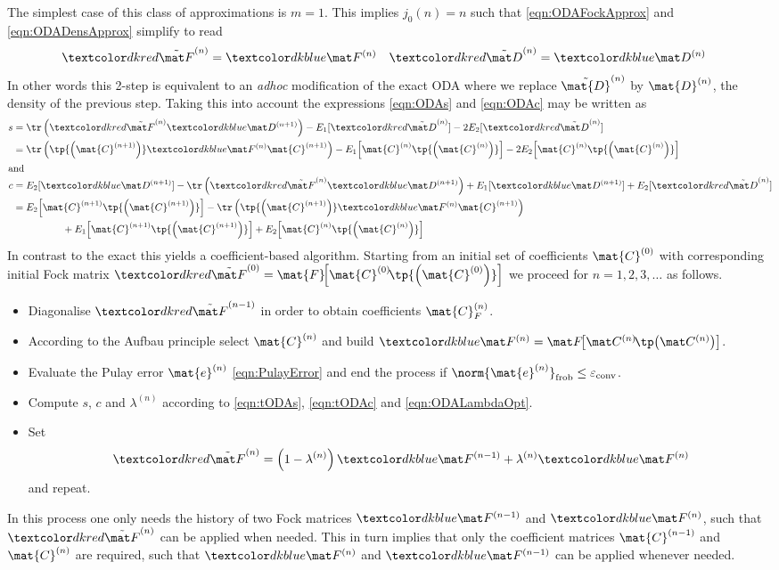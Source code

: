The simplest case of this class of approximations is $m=1$.
This implies $j_0(n) = n$ such that \eqref{eqn:ODAFockApprox}
and \eqref{eqn:ODADensApprox} simplify to read
\begin{align*}
	\Fot{n} &= \Fo{n} & \Pet{n} &= \Pe{n}
\end{align*}
In other words this 2-step \tODA is equivalent to an \textit{adhoc} modification
of the exact ODA where we replace
$\tilde{\mat{D}}^{(n)}$ by $\mat{D}^{(n)}$,
the density of the previous \SCF step.
Taking this into account the expressions \eqref{eqn:ODAs} and \eqref{eqn:ODAc}
may be written as
\begin{align}
	\label{eqn:tODAs}
	\nonumber
	s &= \tr \left( \Fot{n} \Pe{n+1} \right) - E_1[\Pet{n}] - 2 E_2 [\Pet{n}] \\
	  &= \tr \left( \tp{\left(\mat{C}^{(n+1)}\right)} \Fo{n} \mat{C}^{(n+1)} \right)
	  - E_1\!\left[\mat{C}^{(n)} \tp{\left(\mat{C}^{(n)}\right)}\right]
	  - 2 E_2\! \left[\mat{C}^{(n)} \tp{\left(\mat{C}^{(n)}\right)}\right] \\
\intertext{and}
	\label{eqn:tODAc}
	\nonumber
c &= E_2[\Pe{n+1}] - \tr \left( \Fot{n} \Pe{n+1} \right) + E_1[\Pe{n+1}]
		+ E_2 [\Pet{n}] \\
	\nonumber
	&= E_2\!\left[\mat{C}^{(n+1)} \tp{\left(\mat{C}^{(n+1)}\right)}\right]
		- \tr \left( \tp{\left(\mat{C}^{(n+1)}\right)} \Fo{n} \mat{C}^{(n+1)} \right) \\
		&\hspace{50pt}
		+ E_1\!\left[\mat{C}^{(n+1)} \tp{\left(\mat{C}^{(n+1)}\right)}\right]
		+ E_2\!\left[\mat{C}^{(n)} \tp{\left(\mat{C}^{(n)}\right)}\right]
\end{align}
In contrast to the exact \ODA
this yields a coefficient-based \SCF algorithm.
Starting from an initial set of coefficients $\mat{C}^{(0)}$
with corresponding initial Fock matrix $\Fot{0} =
\mat{F}\!\!\left[\mat{C}^{(0)}\!\tp{\left(\mat{C}^{(0)}\right)}\right]$
we proceed for $n=1,2,3,\ldots$ as follows.
\begin{itemize}
	\item Diagonalise $\Fot{n-1}$ in order to obtain coefficients
		$\mat{C}_F^{(n)}$.
	\item According to the Aufbau principle select $\mat{C}^{(n)}$
		and build $\Fo{n} = \matFnfull$.
	\item Evaluate the Pulay error $\mat{e}^{(n)}$ \eqref{eqn:PulayError}
		and end the process if $\norm{\mat{e}^{(n)}}_\text{frob} \leq \epsilonconv$.
	\item Compute $s$, $c$ and $\lambda^{(n)}$
		according to \eqref{eqn:tODAs}, \eqref{eqn:tODAc}
		and \eqref{eqn:ODALambdaOpt}.
	\item Set
		\[ \Fot{n} = \ila{n} \Fo{n-1} + \la{n} \Fo{n} \]
		and repeat.
\end{itemize}
In this process one only needs the history of two Fock matrices $\Fo{n-1}$ and
$\Fo{n}$, such that $\Fot{n}$ can be applied when needed.
This in turn implies that only the coefficient matrices $\mat{C}^{(n-1)}$
and $\mat{C}^{(n)}$ are required, such that $\Fo{n}$ and $\Fo{n-1}$
can be applied whenever needed.

